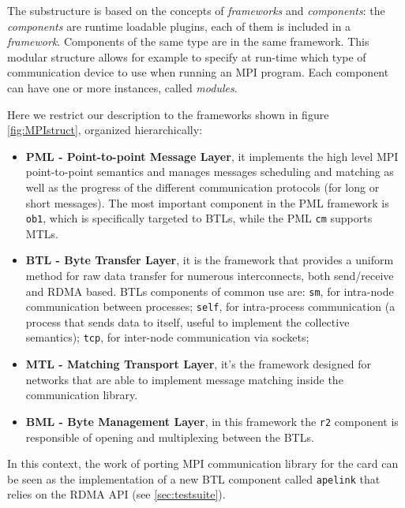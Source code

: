 The substructure is based on the concepts of \emph{frameworks} and
\emph{components}: the \emph{components} are runtime loadable plugins,
each of them is included in a \emph{framework}. Components of the same
type are in the same framework.  This modular structure allows for
example to specify at run-time which type of communication device to
use when running an MPI program.  Each component can have one or more
instances, called \emph{modules}.

Here we restrict our description to the frameworks shown in figure
\ref{fig:MPIstruct}, organized hierarchically:
\begin{itemize}
\item \textbf{PML - Point-to-point Message Layer}, it implements the
  high level MPI point-to-point semantics and manages messages
  scheduling and matching as well as the progress of the different
  communication protocols (for long or short messages). The most
  important component in the PML framework is \texttt{ob1}, which is
  specifically targeted to BTLs, while the PML \texttt{cm} supports
  MTLs.
\item \textbf{BTL - Byte Transfer Layer}, it is the framework that
  provides a uniform method for raw data transfer for numerous
  interconnects, both send/receive and RDMA based. BTLs components of
  common use are: \texttt{sm}, for intra-node communication between
  processes; \texttt{self}, for intra-process communication (a
  process that sends data to itself, useful to implement the
  collective semantics); \texttt{tcp}, for inter-node communication
  via sockets; \etc
\item \textbf{MTL - Matching Transport Layer}, it's the framework
  designed for networks that are able to implement message matching
  inside the communication library.
\item \textbf{BML - Byte Management Layer}, in this framework the
  \texttt{r2} component is responsible of opening and multiplexing
  between the BTLs.
\end{itemize}

In this context, the work of porting MPI communication library for the
\apenetp card can be seen as the implementation of a new BTL component
called \texttt{apelink} that relies on the \apenetp RDMA API (see
\ref{sec:testsuite}).

